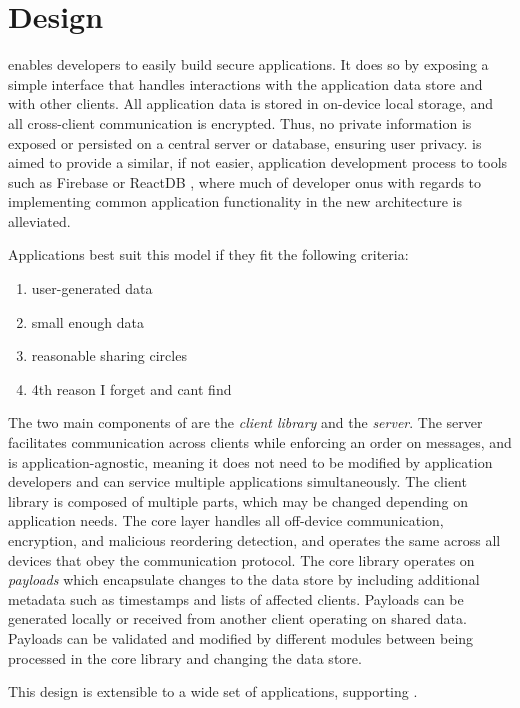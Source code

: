 \section{Design}

\name{} enables developers to easily build secure applications. It does so by exposing a simple interface that handles interactions with the application data store and with other clients. All application data is stored in on-device local storage, and all cross-client communication is encrypted. Thus, no private information is exposed or persisted on a central server or database, ensuring user privacy. \name{} is aimed to provide a similar, if not easier, application development process to tools such as Firebase  or ReactDB \tocite{}, where much of developer onus with regards to implementing common application functionality in the new architecture is alleviated.

Applications best suit this model if they fit the following criteria:
\begin{enumerate}
    \item user-generated data
    \item small enough data
    \item reasonable sharing circles
    \item 4th reason I forget and cant find
\end{enumerate}

The two main components of \name{} are the \textit{client library} and the \textit{\name{} server}. The server facilitates communication across clients while enforcing an order on messages, and is application-agnostic, meaning it does not need to be modified by application developers and can service multiple applications simultaneously. The client library is composed of multiple parts, which may be changed depending on application needs. The \name{} core layer handles all off-device communication, encryption, and malicious reordering detection, and operates the same across all devices that obey the \name{} communication protocol. The core library operates on \textit{payloads} which encapsulate changes to the data store by including additional metadata such as timestamps and lists of affected clients. Payloads can be generated locally or received from another client operating on shared data. Payloads can be validated and modified by different \name{} modules between being processed in the core library and changing the data store.

This design is extensible to a wide set of applications, supporting .

